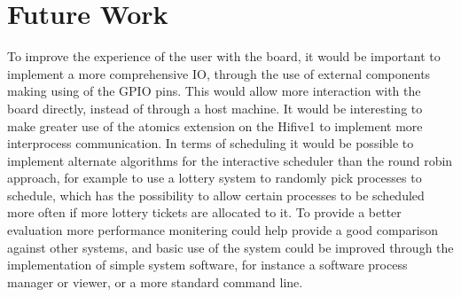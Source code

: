 \section{Future Work}
To improve the experience of the user with the board, it would be important to implement a more comprehensive IO, through the use of external components making using of the GPIO pins. This would allow more interaction with the board directly, instead of through a host machine. It would be interesting to make greater use of the atomics extension on the Hifive1 to implement more interprocess communication. In terms of scheduling it would be possible to implement alternate algorithms for the interactive scheduler than the round robin approach, for example to use a lottery system to randomly pick processes to schedule, which has the possibility to allow certain processes to be scheduled more often if more lottery tickets are allocated to it. To provide a better evaluation more performance monitering could help provide a good comparison against other systems, and basic use of the system could be improved through the implementation of simple system software, for instance a software process manager or viewer, or a more standard command line.
